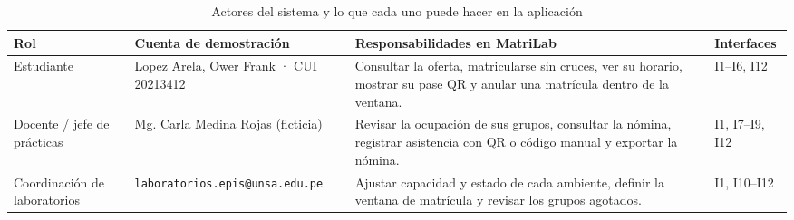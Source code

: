 \begin{table}[H]
\centering\small
\caption{Actores del sistema y lo que cada uno puede hacer en la aplicación}\label{tab:actores}
\renewcommand{\arraystretch}{1.25}
\begin{tabular}{|>{\raggedright\arraybackslash}p{}|>{\raggedright\arraybackslash}p{}|>{\raggedright\arraybackslash}p{}|>{\raggedright\arraybackslash}p{}|}
\hline
\rowcolor{colabpyblue} \color{white}\textbf{Rol} & \color{white}\textbf{Cuenta de demostración} & \color{white}\textbf{Responsabilidades en MatriLab} & \color{white}\textbf{Interfaces} \\ \hline
Estudiante & Lopez Arela, Ower Frank · CUI 20213412 & Consultar la oferta, matricularse sin cruces, ver su horario, mostrar su pase QR y anular una matrícula dentro de la ventana. & I1–I6, I12 \\ \hline
\rowcolor{colabpybg} Docente / jefe de prácticas & Mg. Carla Medina Rojas (ficticia) & Revisar la ocupación de sus grupos, consultar la nómina, registrar asistencia con QR o código manual y exportar la nómina. & I1, I7–I9, I12 \\ \hline
Coordinación de laboratorios & \texttt{laboratorios.\allowbreak{}epis@unsa.\allowbreak{}edu.\allowbreak{}pe} & Ajustar capacidad y estado de cada ambiente, definir la ventana de matrícula y revisar los grupos agotados. & I1, I10–I12 \\ \hline
\end{tabular}
\end{table}

